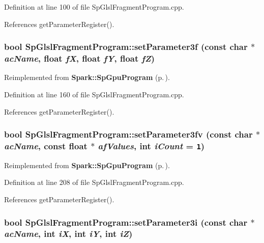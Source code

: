 Definition at line 100 of file Sp\-Glsl\-Fragment\-Program.cpp.

References get\-Parameter\-Register().
\subsubsection{\setlength{\rightskip}{0pt plus 5cm}bool Sp\-Glsl\-Fragment\-Program::set\-Parameter3f (const char $\ast$ {\em ac\-Name}, float {\em f\-X}, float {\em f\-Y}, float {\em f\-Z})\hspace{0.3cm}{\tt  [virtual]}}\label{classSpark_1_1SpGlslFragmentProgram_a11}




Reimplemented from {\bf Spark::Sp\-Gpu\-Program} {\rm (p.\,\pageref{classSpark_1_1SpGpuProgram_a22})}.

Definition at line 160 of file Sp\-Glsl\-Fragment\-Program.cpp.

References get\-Parameter\-Register().
\subsubsection{\setlength{\rightskip}{0pt plus 5cm}bool Sp\-Glsl\-Fragment\-Program::set\-Parameter3fv (const char $\ast$ {\em ac\-Name}, const float $\ast$ {\em af\-Values}, int {\em i\-Count} = {\tt 1})\hspace{0.3cm}{\tt  [virtual]}}\label{classSpark_1_1SpGlslFragmentProgram_a15}




Reimplemented from {\bf Spark::Sp\-Gpu\-Program} {\rm (p.\,\pageref{classSpark_1_1SpGpuProgram_a26})}.

Definition at line 208 of file Sp\-Glsl\-Fragment\-Program.cpp.

References get\-Parameter\-Register().
\subsubsection{\setlength{\rightskip}{0pt plus 5cm}bool Sp\-Glsl\-Fragment\-Program::set\-Parameter3i (const char $\ast$ {\em ac\-Name}, int {\em i\-X}, int {\em i\-Y}, int {\em i\-Z})\hspace{0.3cm}{\tt  [virtual]}}\label{classSpark_1_1SpGlslFragmentProgram_a3}




